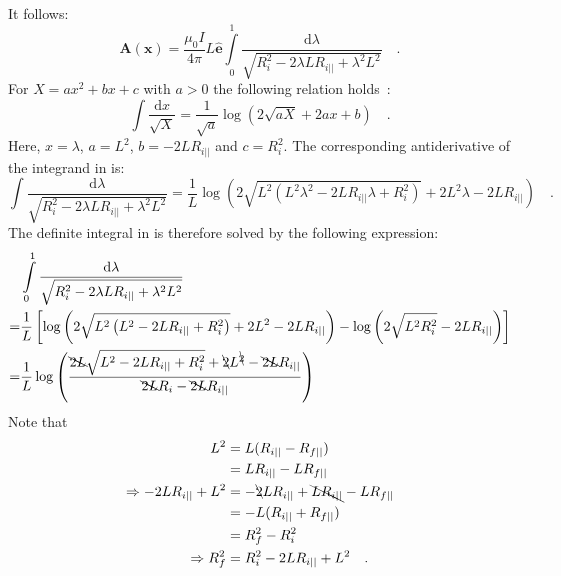 It follows:
\begin{equation}
 \mathbf{A}(\mathbf{x})
 = \frac{\mu_0 I}{4 \pi} L \hat{\mathbf{e}} \int\limits_0^1 \frac{\mathrm{d}\lambda}{\sqrt{R_i^2 - 2 \lambda L R_{i ||} + \lambda^2 L^2}} \quad . \label{eqn:A_integral}
\end{equation}
For $X = a x^2 + b x + c$ with $a>0$ the following relation holds~\cite{bronstein}:
\begin{equation}
 \int \frac{\mathrm{d}x}{\sqrt{X}} = \frac{1}{\sqrt{a}} \log \left( 2 \sqrt{a X} + 2 a x + b \right) \quad .
\end{equation}
Here, $x = \lambda$, $a = L^2$, $b=-2 L R_{i ||}$ and $c=R_i^2$.
The corresponding antiderivative of the integrand in  is:
\begin{equation}
   \int\frac{\mathrm{d}\lambda}{\sqrt{R_i^2 - 2 \lambda L R_{i ||} + \lambda^2 L^2}}
 = \frac{1}{L} \log \left( 2 \sqrt{L^2\left( L^2 \lambda^2 - 2 L R_{i ||} \lambda + R_i^2 \right)} + 2 L^2 \lambda - 2 L R_{i ||} \right) \quad .
\end{equation}
The definite integral in  is therefore solved by the following expression:
\begin{align}
 ~ & \int\limits_0^1 \frac{\mathrm{d}\lambda}{\sqrt{R_i^2 - 2 \lambda L R_{i ||} + \lambda^2 L^2}} \\
 = & \frac{1}{L} \left[ \log \left( 2 \sqrt{L^2\left( L^2 - 2 L R_{i ||} + R_i^2 \right)} + 2 L^2 - 2 L R_{i ||} \right) - \log \left( 2 \sqrt{L^2 R_i^2 } - 2 L R_{i ||} \right) \right] \\
 = & \frac{1}{L} \log \left( \frac{ \bcancel{2 L} \sqrt{L^2 - 2 L R_{i ||} + R_i^2} + \bcancel{2} L^{\bcancel{2}} - \bcancel{2 L} R_{i ||} }{ \bcancel{2 L} R_i - \bcancel{2 L} R_{i ||} } \right)
\end{align}
Note that
\begin{align}
                             L^2 & = L (R_{i ||} - R_{f ||} ) \\
                              ~  & = L R_{i ||} - L R_{f ||} \\
\Rightarrow -2 L R_{i ||} + L^2  & = - \bcancel{2} L R_{i ||}  + \bcancel{L R_{i ||}} - L R_{f ||} \\
                              ~  & = -L (R_{i ||} + R_{f ||} ) \\
                              ~  & = R_f^2 - R_i^2 \\
\Rightarrow                R_f^2 & = R_i^2 -2 L R_{i ||} + L^2 \quad .
\end{align}
